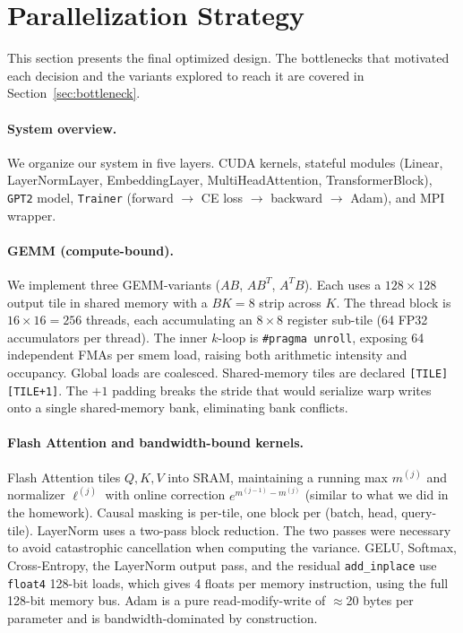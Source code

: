 \documentclass[11pt,letterpaper]{article}
\begin{document}
\section{Parallelization Strategy}
This section presents the final optimized design. The bottlenecks that motivated each decision and the variants explored to reach it are covered in Section~\ref{sec:bottleneck}.

\paragraph{System overview.} We organize our system in five layers. CUDA kernels, stateful modules (Linear, LayerNormLayer,
EmbeddingLayer, MultiHeadAttention, TransformerBlock), \texttt{GPT2} model,
\texttt{Trainer} (forward $\to$ CE loss $\to$ backward $\to$ Adam), and MPI
wrapper.

\paragraph{GEMM (compute-bound).}
We implement three GEMM-variants ($AB$, $AB^T$, $A^TB$). Each uses a $128{\times}128$
output tile in shared memory with a $BK{=}8$ strip across $K$. The thread
block is $16{\times}16{=}256$ threads, each accumulating an $8{\times}8$
register sub-tile (64 FP32 accumulators per thread). The inner $k$-loop
is \texttt{\#pragma unroll}, exposing 64 independent FMAs per smem load, raising both arithmetic intensity and occupancy.
Global loads are coalesced. Shared-memory tiles are declared
\texttt{[TILE][TILE+1]}. The $+1$ padding breaks the stride that would
serialize warp writes onto a single shared-memory bank, eliminating
bank conflicts.

\paragraph{Flash Attention and bandwidth-bound kernels.}
Flash Attention tiles $Q, K, V$ into SRAM, maintaining a running max
$m^{(j)}$ and normalizer $\ell^{(j)}$ with online correction
$e^{m^{(j-1)}-m^{(j)}}$ (similar to what we did in the homework). Causal masking is per-tile, one block per
(batch, head, query-tile). LayerNorm uses a two-pass block reduction. The two passes were necessary to avoid catastrophic cancellation when computing the variance. GELU, Softmax, Cross-Entropy, the LayerNorm output
pass, and the residual \texttt{add\_inplace} use \texttt{float4} 128-bit
loads, which gives 4 floats per memory instruction, using the full 128-bit memory
bus. Adam is a pure read-modify-write of $\approx$20 bytes per parameter
and is bandwidth-dominated by construction.
\end{document}
